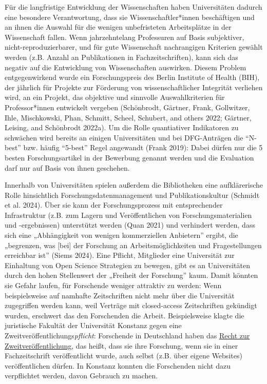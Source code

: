 \documentclass[
  letterpaper,
  DIV=11,
  numbers=noendperiod]{scrreprt}
\begin{document}
Für die langfristige Entwicklung der Wissenschaften haben Universitäten
dadurch eine besondere Verantwortung, dass sie Wissenschaftler*innen
beschäftigen und an ihnen die Auswahl für die wenigen unbefristeten
Arbeitsplätze in der Wissenschaft fallen. Wenn jahrzehntelang
Professuren auf Basis subjektiver, nicht-reproduzierbarer, und für gute
Wissenschaft nachrangigen Kriterien gewählt werden (z.B. Anzahl an
Publikationen in Fachzeitschriften), kann sich das negativ auf die
Entwicklung von Wissenschaften auswirken. Diesem Problem entgegenwirkend
wurde ein Forschungspreis des Berlin Institute of Health (BIH), der
jährlich für Projekte zur Förderung von wissenschaftlicher Integrität
verliehen wird, an ein Projekt, das objektive und sinnvolle
Auswahlkriterien für Professor*innen entwickelt vergeben (Schönbrodt,
Gärtner, Frank, Gollwitzer, Ihle, Mischkowski, Phan, Schmitt, Scheel,
Schubert, and others 2022; Gärtner, Leising, and Schönbrodt 2022a). Um
die Rolle quantiativer Indikatoren zu schwächen wird bereits an einigen
Universitäten und bei DFG-Anträgen die ``N-best'' bzw. häufig ``5-best''
Regel angewandt (Frank 2019): Dabei dürfen nur die 5 besten
Forschungsartikel in der Bewerbung genannt werden und die Evaluation
darf nur auf Basis von ihnen geschehen.

Innerhalb von Universitäten spielen außerdem die Bibliotheken eine
aufklärerische Rolle hinsichtlich Forschungsdatenmanagement und
Publikationskultur (Schmidt et al. 2024). Über sie kann der
Forschungsprozess mit entsprechender Infrastruktur (z.B. zum Lagern und
Veröffentlichen von Forschungsmaterialien und -ergebnissen) unterstützt
werden (Quan 2021) und verhindert werden, dass sich eine „Abhängigkeit
von wenigen kommerziellen Anbietern'' ergibt, die „begrenzen, was
{[}bei{]} der Forschung an Arbeitsmöglichkeiten und Fragestellungen
erreichbar ist'' (Siems 2024). Eine Pflicht, Mitglieder eine Universität
zur Einhaltung von Open Science Strategien zu bewegen, gibt es an
Universitäten durch den hohen Stellenwert der „Freiheit der Forschung''
kaum. Damit könnten sie Gefahr laufen, für Forschende weniger attraktiv
zu werden: Wenn beispielsweise auf namhafte Zeitschriften nicht mehr
über die Universität zugegriffen werden kann, weil Verträge mit
closed-access Zeitschriften gekündigt wurden, erschwert das den
Forschenden die Arbeit. Beispielsweise klagte die juristische Fakultät
der Universität Konstanz gegen eine
Zweitveröffentlichungs\emph{pflicht}: Forschende in Deutschland haben
das \href{https://de.wikipedia.org/wiki/Zweitveröffentlichung}{Recht zur
Zweitveröffentlichung}, das heißt, dass sie ihre Forschung, wenn sie in
einer Fachzeitschrift veröffentlicht wurde, auch selbst (z.B. über
eigene Websites) veröffentlichen dürfen. In Konstanz konnten die
Forschenden nicht dazu verpflichtet werden, davon Gebrauch zu machen.
\end{document}
